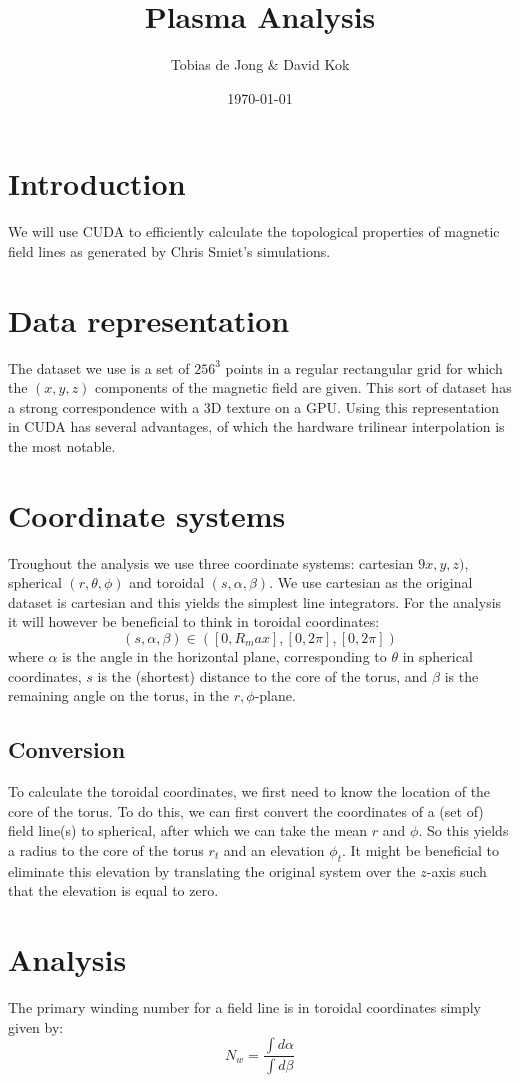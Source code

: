 \documentclass{article}
\begin{document}
\title{Plasma Analysis}
\author{Tobias de Jong \& David Kok}
\date{\today}
\maketitle
\section{Introduction}
We will use CUDA to efficiently calculate the topological properties of magnetic field lines as generated by Chris Smiet's simulations.
\section{Data representation}
The dataset we use is a set of $256^3$ points in a regular rectangular grid for which the $(x,y,z)$ components of the magnetic field are given. This sort of dataset has a strong correspondence with a 3D texture on a GPU. Using this representation in CUDA has several advantages, of which the hardware trilinear interpolation is the most notable.
\section{Coordinate systems}
Troughout the analysis we use three coordinate systems: cartesian $9x,y,z)$, spherical $(r,\theta,\phi)$ and toroidal $(s,\alpha, \beta)$. We use cartesian as the original dataset is cartesian and this yields the simplest line integrators. For the analysis it will however be beneficial to think in toroidal coordinates:
\[(s,\alpha,\beta)\in ([0,R_max],[0,2\pi],[0,2\pi])\]
where $\alpha$ is the angle in the horizontal plane, corresponding to $\theta$ in spherical coordinates, $s$ is the (shortest) distance to the core of the torus, and $\beta$ is the remaining angle on the torus, in the $r,\phi$-plane.
\subsection{Conversion}
To calculate the toroidal coordinates, we first need to know the location of the core of the torus. To do this, we can first convert the coordinates of a (set of) field line(s) to spherical, after which we can take the mean $r$ and $\phi$. So this yields a radius to the core of the torus $r_t$ and an elevation $\phi_t$. It might be beneficial to eliminate this elevation by translating the original system over the $z$-axis such that the elevation is equal to zero.
\section{Analysis}
The primary winding number for a field line is in toroidal coordinates simply given by:
\[N_w = \frac{\int d\alpha}{\int d\beta}\]
\end{document}
